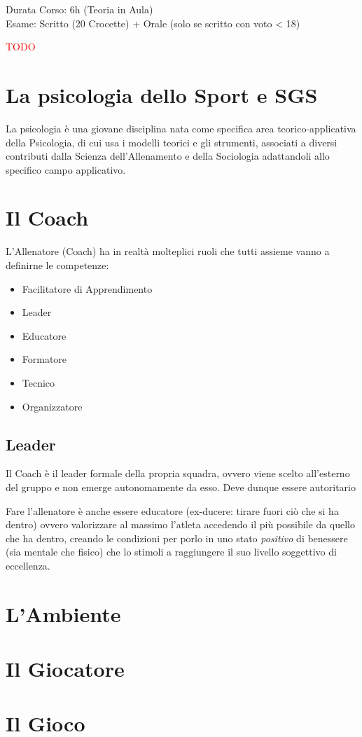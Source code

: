 \documentclass[../uefaC.tex]{subfiles}
\begin{document}

Durata Corso: 6h (Teoria in Aula) \hfill \\
Esame: Scritto (20 Crocette) + Orale (solo se scritto con voto < 18)

\textcolor{red}{TODO}

\section{La psicologia dello Sport e SGS}

La psicologia è una giovane disciplina nata come specifica area teorico-applicativa della Psicologia, di cui usa i modelli teorici e gli strumenti, associati a diversi contributi dalla Scienza dell'Allenamento e della Sociologia adattandoli allo specifico campo applicativo.

\section{Il Coach}
L'Allenatore (Coach) ha in realtà molteplici ruoli che tutti assieme vanno a definirne le competenze:
\begin{itemize}
    \item Facilitatore di Apprendimento
    \item Leader
    \item Educatore
    \item Formatore
    \item Tecnico
    \item Organizzatore
\end{itemize}

\subsection{Leader}
Il Coach è il leader formale della propria squadra, ovvero viene scelto all'esterno del gruppo e non emerge autonomamente da esso. Deve dunque essere autoritario 

Fare l'allenatore è anche essere educatore (ex-ducere: tirare fuori ciò che si ha dentro) ovvero valorizzare al massimo l'atleta accedendo il più possibile da quello che ha dentro, creando le condizioni per porlo in uno stato \emph{positivo} di benessere (sia mentale che fisico) che lo stimoli a raggiungere il suo livello soggettivo di eccellenza. \hfill \\
\section{L'Ambiente}

\section{Il Giocatore}

\section{Il Gioco}
\end{document}
